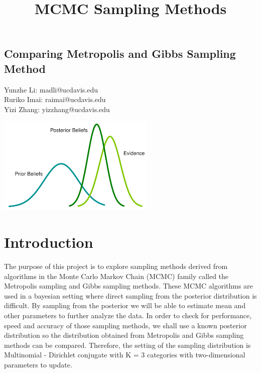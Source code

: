 \documentclass[11pt,a4paper]{article}
\begin{document}
\title{MCMC Sampling Methods}
\pagestyle{fancy}

{
\fancyhf{}
\cfoot{\thepage}
}

\vspace*{\fill}
\begin{center}
\subsection*{ 
\huge Comparing Metropolis and Gibbs Sampling Method
}
\end{center}

\begin{center}
Yunzhe Li: madli@ucdavis.edu \\
Ruriko Imai: raimai@ucdavis.edu \\
Yizi Zhang: yizzhang@ucdavis.edu
\end{center}
\bigskip
\bigskip
\bigskip
\bigskip
\bigskip
\bigskip
\bigskip
\bigskip
\bigskip
\bigskip
\bigskip
\bigskip


\begin{center}
\includegraphics[scale=1.5]{images/cover.png}
\end{center}
\vspace*{\fill}
\newpage


\section*{Introduction}
The purpose of this project is to explore sampling methods derived from algorithms in the Monte Carlo Markov Chain (MCMC) family called the Metropolis sampling and Gibbs sampling methods. These MCMC algorithms are used in a bayesian setting where direct sampling from the posterior distribution is difficult. By sampling from the posterior we will be able to estimate mean and other parameters to further analyze the data. In order to check for performance, speed and accuracy of those sampling methods, we shall use a known posterior distribution so the distribution obtained from Metropolis and Gibbs sampling methods can be compared. Therefore, the  setting of the sampling distribution is Multinomial - Dirichlet conjugate with K = 3 categories with two-dimensional parameters to update. 
\end{document}

